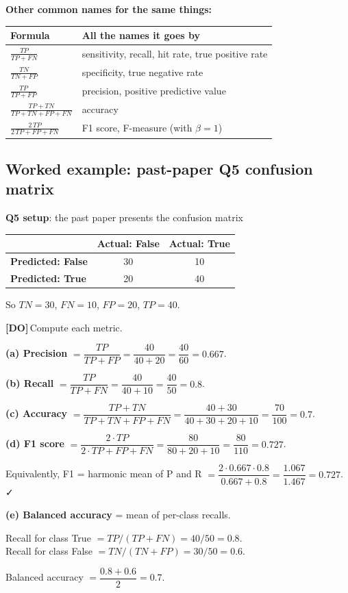 \documentclass[11pt, a4paper]{article}
\newcommand{\thead}[1]{\textbf{#1}}
\newcommand{\doflag}{\textcolor{defBd}{\textbf{[DO]}}\,}
\begin{document}
\textbf{Other common names for the same things:}
\begin{center}
\renewcommand{\arraystretch}{1.2}
\begin{tabularx}{\linewidth}{l X}
\toprule
\thead{Formula} & \thead{All the names it goes by} \\
\midrule
$\frac{TP}{TP+FN}$ & sensitivity, recall, hit rate, true positive rate \\
$\frac{TN}{TN+FP}$ & specificity, true negative rate \\
$\frac{TP}{TP+FP}$ & precision, positive predictive value \\
$\frac{TP+TN}{TP+TN+FP+FN}$ & accuracy \\
$\frac{2\,TP}{2\,TP+FP+FN}$ & F1 score, F-measure (with $\beta=1$) \\
\bottomrule
\end{tabularx}
\end{center}

\subsection{Worked example: past-paper Q5 confusion matrix}

\textbf{Q5 setup}: the past paper presents the confusion matrix
\begin{center}
\begin{tabular}{l|cc}
& \textbf{Actual: False} & \textbf{Actual: True} \\
\hline
\textbf{Predicted: False} & 30 & 10 \\
\textbf{Predicted: True} & 20 & 40 \\
\end{tabular}
\end{center}

So $TN = 30$, $FN = 10$, $FP = 20$, $TP = 40$.

\doflag{}Compute each metric.

\begin{exbox}
\textbf{(a) Precision} $= \dfrac{TP}{TP + FP} = \dfrac{40}{40 + 20} = \dfrac{40}{60} = \mathbf{0.667}$.

\textbf{(b) Recall} $= \dfrac{TP}{TP + FN} = \dfrac{40}{40 + 10} = \dfrac{40}{50} = \mathbf{0.8}$.

\textbf{(c) Accuracy} $= \dfrac{TP + TN}{TP + TN + FP + FN} = \dfrac{40 + 30}{40 + 30 + 20 + 10} = \dfrac{70}{100} = \mathbf{0.7}$.

\textbf{(d) F1 score} $= \dfrac{2 \cdot TP}{2 \cdot TP + FP + FN} = \dfrac{80}{80 + 20 + 10} = \dfrac{80}{110} = \mathbf{0.727}$.

Equivalently, F1 = harmonic mean of P and R $= \dfrac{2 \cdot 0.667 \cdot 0.8}{0.667 + 0.8} = \dfrac{1.067}{1.467} = \mathbf{0.727}$. ✓

\textbf{(e) Balanced accuracy} = mean of per-class recalls.

Recall for class True $= TP / (TP + FN) = 40 / 50 = 0.8$. \\
Recall for class False $= TN / (TN + FP) = 30 / 50 = 0.6$.

Balanced accuracy $= \dfrac{0.8 + 0.6}{2} = \mathbf{0.7}$.
\end{exbox}
\end{document}

